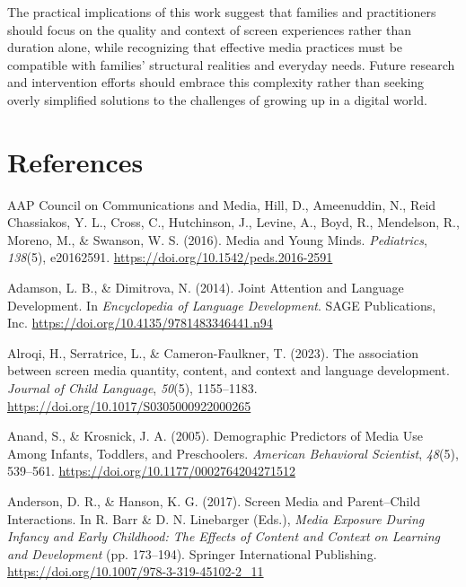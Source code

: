 \documentclass[
  man,
  floatsintext,
  longtable,
  nolmodern,
  notxfonts,
  notimes,
  colorlinks=true,linkcolor=blue,citecolor=blue,urlcolor=blue]{apa7}
\newlength{\cslhangindent}
\newenvironment{CSLReferences}[2] %
 {\begin{list}{}{%
  \setlength{\itemindent}{0pt}
  \setlength{\leftmargin}{0pt}
  \setlength{\parsep}{0pt}
  \ifodd #1
   \setlength{\leftmargin}{\cslhangindent}
   \setlength{\itemindent}{-1\cslhangindent}
  \fi
  \setlength{\itemsep}{#2\baselineskip}}}
 {\end{list}}
\begin{document}
The practical implications of this work suggest that families and
practitioners should focus on the quality and context of screen
experiences rather than duration alone, while recognizing that effective
media practices must be compatible with families' structural realities
and everyday needs. Future research and intervention efforts should
embrace this complexity rather than seeking overly simplified solutions
to the challenges of growing up in a digital world.

\newpage

\section{References}\label{references}

\label{refs}
\begin{CSLReferences}{1}{0}
AAP Council on Communications and Media, Hill, D., Ameenuddin, N., Reid
Chassiakos, Y. L., Cross, C., Hutchinson, J., Levine, A., Boyd,
R., Mendelson, R., Moreno, M., \& Swanson, W. S. (2016). Media and
{Young Minds}. \emph{Pediatrics}, \emph{138}(5), e20162591.
\url{https://doi.org/10.1542/peds.2016-2591}

Adamson, L. B., \& Dimitrova, N. (2014). Joint {Attention} and {Language
Development}. In \emph{Encyclopedia of {Language Development}}. SAGE
Publications, Inc. \url{https://doi.org/10.4135/9781483346441.n94}

Alroqi, H., Serratrice, L., \& Cameron-Faulkner, T. (2023). The
association between screen media quantity, content, and context and
language development. \emph{Journal of Child Language}, \emph{50}(5),
1155--1183. \url{https://doi.org/10.1017/S0305000922000265}

Anand, S., \& Krosnick, J. A. (2005). Demographic {Predictors} of {Media
Use Among Infants}, {Toddlers}, and {Preschoolers}. \emph{American
Behavioral Scientist}, \emph{48}(5), 539--561.
\url{https://doi.org/10.1177/0002764204271512}

Anderson, D. R., \& Hanson, K. G. (2017). Screen {Media} and
{Parent}--{Child Interactions}. In R. Barr \& D. N. Linebarger (Eds.),
\emph{Media {Exposure During Infancy} and {Early Childhood}: {The
Effects} of {Content} and {Context} on {Learning} and {Development}}
(pp. 173--194). Springer International Publishing.
\url{https://doi.org/10.1007/978-3-319-45102-2_11}


\end{CSLReferences}
\end{document}
